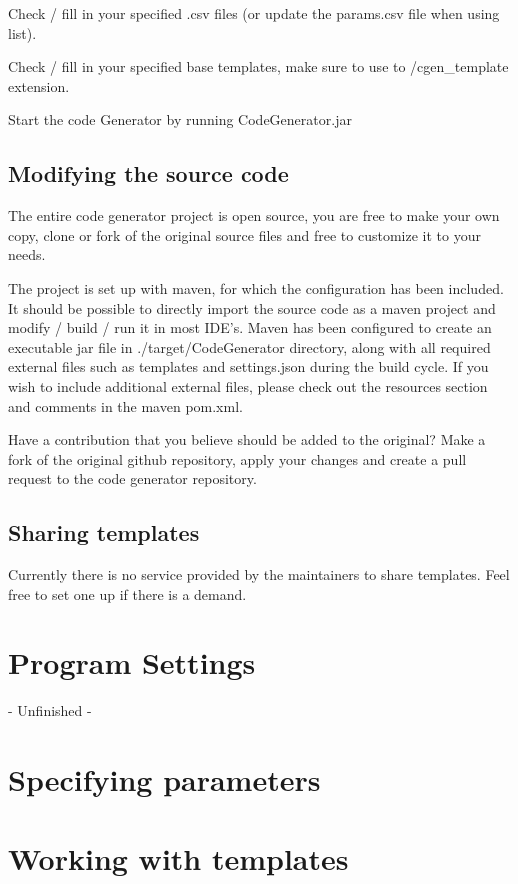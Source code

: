 \documentclass{settings/TU_Delft_Report}
\begin{document}
\vsp Check / fill in your specified .csv files (or update the params.csv file when using list).

\vsp Check / fill in your specified base templates, make sure to use to /cgen\_template extension.

\vsp Start the code Generator by running CodeGenerator.jar

\section{Modifying the source code}
The entire code generator project is open source, you are free to make your own copy, clone or fork of the original source files and free to customize it to your needs.\vsp

The project is set up with maven, for which the configuration has been included. It should be possible to directly import the source code as a maven project and modify / build / run it in most IDE's. Maven has been configured to create an executable jar file in ./target/CodeGenerator directory, along with all required external files such as templates and settings.json during the build cycle. If you wish to include additional external files, please check out the resources section and comments in the maven pom.xml.\vsp

Have a contribution that you believe should be added to the original? Make a fork of the original github repository, apply your changes and create a pull request to the code generator repository.

\section{Sharing templates}
Currently there is no service provided by the maintainers to share templates. Feel free to set one up if there is a demand.

\chapter{Program Settings}
- Unfinished -

\chapter{Specifying parameters}

\chapter{Working with templates}
\end{document}
